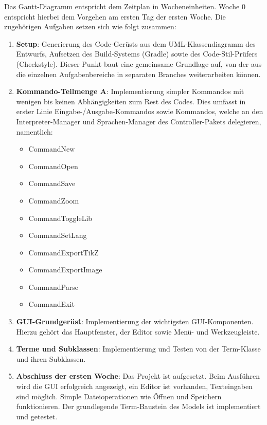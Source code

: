 \documentclass[parskip=full,11pt,twoside]{scrartcl}
\begin{document}
Das Gantt-Diagramm entspricht dem Zeitplan in Wocheneinheiten. Woche 0 entspricht hierbei dem Vorgehen am ersten Tag der ersten Woche. Die zugehörigen Aufgaben setzen sich wie folgt zusammen:
\begin{enumerate}
	\item \textbf{Setup}: Generierung des Code-Gerüsts aus dem UML-Klassendiagramm des Entwurfs, Aufsetzen des Build-Systems (Gradle) sowie des Code-Stil-Prüfers (Checkstyle). Dieser Punkt baut eine gemeinsame Grundlage auf, von der aus die einzelnen Aufgabenbereiche in separaten Branches weiterarbeiten können.
	
	\item \textbf{Kommando-Teilmenge A}: Implementierung simpler Kommandos mit wenigen bis keinen Abhängigkeiten zum Rest des Codes. Dies umfasst in erster Linie Eingabe-/Ausgabe-Kommandos sowie Kommandos, welche an den Interpreter-Manager und Sprachen-Manager des Controller-Pakets delegieren, namentlich:
	\begin{multicols}{3}
		\begin{itemize}
			\item CommandNew
			\item CommandOpen
			\item CommandSave
			\item CommandZoom

			\item CommandToggleLib
			\item CommandSetLang
			\item CommandExportTikZ
			\item CommandExportImage

			\item CommandParse
			\item CommandExit
		\end{itemize}
	\end{multicols}

	\item \textbf{GUI-Grundgerüst}: Implementierung der wichtigsten GUI-Komponenten. Hierzu gehört das Hauptfenster, der Editor sowie Menü- und Werkzeugleiste.
	
	\item \textbf{Terme und Subklassen}: Implementierung und Testen von der Term-Klasse und ihren Subklassen.
	
	\item \textbf{Abschluss der ersten Woche}: Das Projekt ist aufgesetzt. Beim Ausführen wird die GUI erfolgreich angezeigt, ein Editor ist vorhanden, Texteingaben sind möglich. Simple Dateioperationen wie Öffnen und Speichern funktionieren. Der grundlegende Term-Baustein des Models ist implementiert und getestet.


\end{enumerate}
\end{document}
